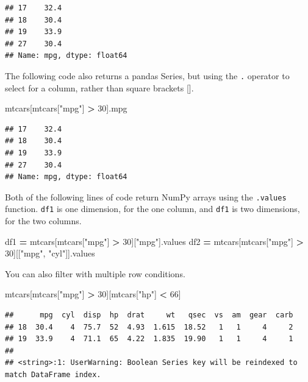 \documentclass[
]{book}
\newenvironment{Shaded}{\begin{snugshade}}{\end{snugshade}}
\newcommand{\DecValTok}[1]{\textcolor[rgb]{0.00,0.00,0.81}{#1}}
\newcommand{\NormalTok}[1]{#1}
\newcommand{\OperatorTok}[1]{\textcolor[rgb]{0.81,0.36,0.00}{\textbf{#1}}}
\newcommand{\StringTok}[1]{\textcolor[rgb]{0.31,0.60,0.02}{#1}}
\begin{document}
\begin{verbatim}
## 17    32.4
## 18    30.4
## 19    33.9
## 27    30.4
## Name: mpg, dtype: float64
\end{verbatim}

The following code also returns a pandas Series, but using the \texttt{.} operator to select for a column, rather than square brackets {[}{]}.

\begin{Shaded}
\begin{Highlighting}[]
\NormalTok{mtcars[mtcars[}\StringTok{"mpg"}\NormalTok{] }\OperatorTok{\textgreater{}} \DecValTok{30}\NormalTok{].mpg}
\end{Highlighting}
\end{Shaded}

\begin{verbatim}
## 17    32.4
## 18    30.4
## 19    33.9
## 27    30.4
## Name: mpg, dtype: float64
\end{verbatim}

Both of the following lines of code return NumPy arrays using the \texttt{.values} function. \texttt{df1} is one dimension, for the one column, and \texttt{df1} is two dimensions, for the two columns.

\begin{Shaded}
\begin{Highlighting}[]
\NormalTok{df1 }\OperatorTok{=}\NormalTok{ mtcars[mtcars[}\StringTok{"mpg"}\NormalTok{] }\OperatorTok{\textgreater{}} \DecValTok{30}\NormalTok{][}\StringTok{"mpg"}\NormalTok{].values}
\NormalTok{df2 }\OperatorTok{=}\NormalTok{ mtcars[mtcars[}\StringTok{"mpg"}\NormalTok{] }\OperatorTok{\textgreater{}} \DecValTok{30}\NormalTok{][[}\StringTok{"mpg"}\NormalTok{, }\StringTok{"cyl"}\NormalTok{]].values}
\end{Highlighting}
\end{Shaded}

You can also filter with multiple row conditions.

\begin{Shaded}
\begin{Highlighting}[]
\NormalTok{mtcars[mtcars[}\StringTok{"mpg"}\NormalTok{] }\OperatorTok{\textgreater{}} \DecValTok{30}\NormalTok{][mtcars[}\StringTok{"hp"}\NormalTok{] }\OperatorTok{\textless{}} \DecValTok{66}\NormalTok{]}
\end{Highlighting}
\end{Shaded}

\begin{verbatim}
##      mpg  cyl  disp  hp  drat     wt   qsec  vs  am  gear  carb
## 18  30.4    4  75.7  52  4.93  1.615  18.52   1   1     4     2
## 19  33.9    4  71.1  65  4.22  1.835  19.90   1   1     4     1
## 
## <string>:1: UserWarning: Boolean Series key will be reindexed to match DataFrame index.
\end{verbatim}
\end{document}

